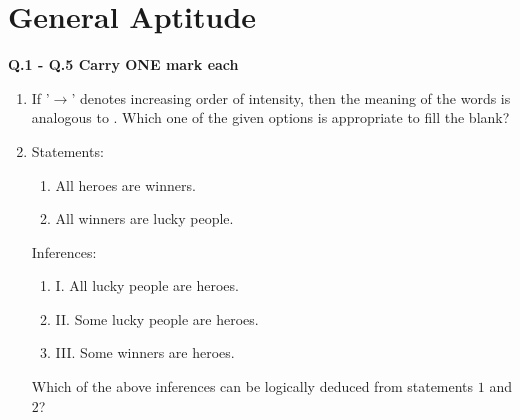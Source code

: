 \documentclass[journal,12pt,onecolumn]{article}
\theoremstyle{remark}
\begin{document}
\section*{General Aptitude }
\textbf{Q.1 - Q.5 Carry ONE mark each}
\begin{enumerate}
    \item If '$\rightarrow$' denotes increasing order of intensity, then the meaning of the words
     is analogous to .
    Which one of the given options is appropriate to fill the blank?

    \hfill{}
    \begin{enumerate}
    \end{enumerate}

    \item Statements:
    \begin{enumerate}
        \item All heroes are winners.
        \item All winners are lucky people.
    \end{enumerate}
    Inferences:
    \begin{enumerate}
        \item I. All lucky people are heroes.
        \item II. Some lucky people are heroes.
        \item III. Some winners are heroes.
    \end{enumerate}
    Which of the above inferences can be logically deduced from statements $1$ and $2$?

    \hfill{}
    \begin{enumerate}
    \end{enumerate}


\end{enumerate}
\end{document}
